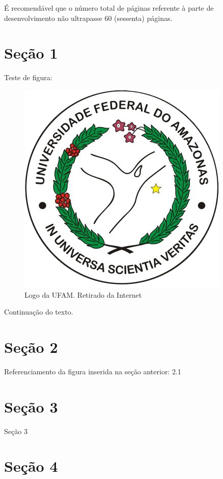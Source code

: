 \documentclass[
	12pt,				%
	openright,			%
	oneside,	
	a4paper,				%
	english,				%
	brazil				%
]{abntex2/abntex2} %
\begin{document}
	É recomendável que o número total de páginas referente à parte de desenvolvimento não ultrapasse 60 (sessenta) páginas.

	\section{Seção 1}

		Teste de figura:

		\begin{figure}[h!]
			\begin{center}
			    \includegraphics[scale=0.5]{abntex2/ufam-logo}
			\end{center}
			\caption{\label{fig_grafico}Logo da UFAM. Retirado da Internet}
		\end{figure}
		
		Continuação do texto.
		
	\section{Seção 2}
	
		Referenciamento da figura inserida na seção anterior: 2.1
		
	\section{Seção 3}
	
		Seção 3
		
	\section{Seção 4}
	
\end{document}
